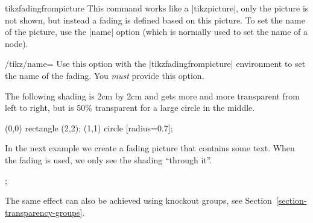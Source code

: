 \begin{environment}{{tikzfadingfrompicture}}
    This command works like a |{tikzpicture}|, only the picture is not shown,
    but instead a fading is defined based on this picture. To set the name of
    the picture, use the |name| option (which is normally used to set the name
    of a node).
    \begin{key}{/tikz/name=}
        Use this option with the |{tikzfadingfrompicture}| environment to set
        the name of the fading. You \emph{must} provide this option.
    \end{key}

    The following shading is 2cm by 2cm and gets more and more transparent from
    left to right, but is 50\% transparent for a large circle in the middle.
{\ifpgfmanualexternalize\tikzexternaldisable\fi
\begin{codeexample}[preamble={\usetikzlibrary{fadings,patterns}}]
\begin{tikzfadingfrompicture}[name=fade right with circle]
  \shade[left color=transparent!0,
         right color=transparent!100] (0,0) rectangle (2,2);
  \fill[transparent!50] (1,1) circle [radius=0.7];
\end{tikzfadingfrompicture}

\end{codeexample}
    In the next example we create a fading picture that contains some text.
    When the fading is used, we only see the shading ``through it''.
\begin{codeexample}[preamble={\usetikzlibrary{fadings,patterns}}]
\begin{tikzfadingfrompicture}[name=tikz]
  ;
\end{tikzfadingfrompicture}

\end{codeexample}
}%

    The same effect can also be achieved using knockout groups, see
    Section~\ref{section-transparency-groups}.
\end{environment}

